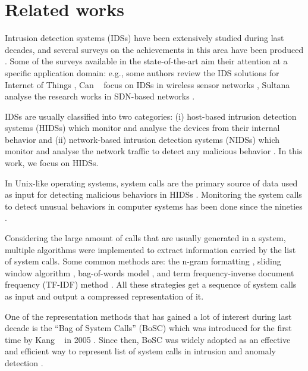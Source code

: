 \section{Related works}\label{sec:relworks}

Intrusion detection systems (IDSs) have been extensively studied during last decades, and several surveys on the achievements in this area have been produced \cite{liao2013intrusion,borkar2017survey,hindy2018taxonomy}. 
Some of the surveys available in the state-of-the-art aim their attention at a specific application domain: e.g., some authors review the IDS solutions for Internet of Things \cite{sherasiya2016survey,chaabouni2019network}, Can \etal~ focus on IDSs in wireless sensor networks \cite{can2015survey},  Sultana \etal~ analyse the research works in SDN-based networks \cite{sultana2019survey}. 

IDSs are usually classified into two categories: (i) host-based intrusion detection systems (HIDSs) which monitor and analyse the devices from their internal behavior \cite{liu2018host} and (ii) network-based intrusion detection systems (NIDSs) which monitor and analyse the network traffic to detect any malicious behavior \cite{chaabouni2019network}. In this work, we focus on HIDSs.

In Unix-like operating systems, system calls are the primary source of data used as input for detecting malicious behaviors in HIDSs \cite{liu2018host}. Monitoring the system calls to detect unusual behaviors in computer systems has been done since the nineties \cite{hofmeyr1998intrusion}.

Considering the large amount of calls that are usually generated in a system, multiple algorithms were implemented to extract information carried by the list of system calls. Some common methods are: the n-gram formatting \cite{khreich2017anomaly}, sliding window algorithm \cite{eskin2001modeling}, bag-of-words model \cite{kang2005learning}, and term frequency-inverse document frequency (TF-IDF) method \cite{chen2005application}. All these strategies get a sequence of  system calls as input and output a compressed representation of it.

One of the representation methods that has gained a lot of interest during last decade is the ``Bag of System Calls'' (BoSC) which was introduced for the first time by Kang \etal~ in 2005 \cite{kang2005learning}. Since then, BoSC was widely adopted as an effective and efficient way to represent list of system calls in intrusion and anomaly detection \cite{chen2005application}.



